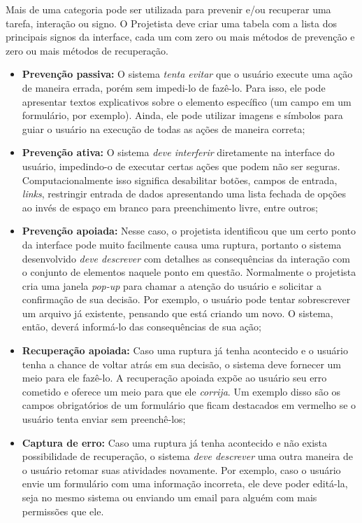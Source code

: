 \indent Mais de uma categoria pode ser utilizada para prevenir e/ou recuperar uma tarefa, interação ou signo. O Projetista deve criar uma tabela com a lista dos principais signos da interface, cada um com zero ou mais métodos de prevenção e zero ou mais métodos de recuperação.

\begin{itemize}

\item \textbf{Prevenção passiva:} O sistema \textit{tenta evitar} que o usuário execute uma ação de maneira errada, porém sem impedi-lo de fazê-lo. Para isso, ele pode apresentar textos explicativos sobre o elemento específico (um campo em um formulário, por exemplo). Ainda, ele pode utilizar imagens e símbolos para guiar o usuário na execução de todas as ações de maneira correta;

\item \textbf{Prevenção ativa:} O sistema \textit{deve interferir} diretamente na interface do usuário, impedindo-o de executar certas ações que podem não ser seguras. Computacionalmente isso significa desabilitar botões, campos de entrada, \textit{links}, restringir entrada de dados apresentando uma lista fechada de opções ao invés de espaço em branco para preenchimento livre, entre outros;

\item \textbf{Prevenção apoiada:} Nesse caso, o projetista identificou que um certo ponto da interface pode muito facilmente causa uma ruptura, portanto o sistema desenvolvido \textit{deve descrever} com detalhes as consequências da interação com o conjunto de elementos naquele ponto em questão. Normalmente o projetista cria uma janela \textit{pop-up} para chamar a atenção do usuário e solicitar a confirmação de sua decisão. Por exemplo, o usuário pode tentar sobrescrever um arquivo já existente, pensando que está criando um novo. O sistema, então, deverá informá-lo das consequências de sua ação;

\item \textbf{Recuperação apoiada:} Caso uma ruptura já tenha acontecido e o usuário tenha a chance de voltar atrás em sua decisão, o sistema deve fornecer um meio para ele fazê-lo. A recuperação apoiada expõe ao usuário seu erro cometido e oferece um meio para que ele \textit{corrija}. Um exemplo disso são os campos obrigatórios de um formulário que ficam destacados em vermelho se o usuário tenta enviar sem preenchê-los;

\item \textbf{Captura de erro:} Caso uma ruptura já tenha acontecido e não exista possibilidade de recuperação, o sistema \textit{deve descrever} uma outra maneira de o usuário retomar suas atividades novamente. Por exemplo, caso o usuário envie um formulário com uma informação incorreta, ele deve poder editá-la, seja no mesmo sistema ou enviando um email para alguém com mais permissões que ele.
\end{itemize}


